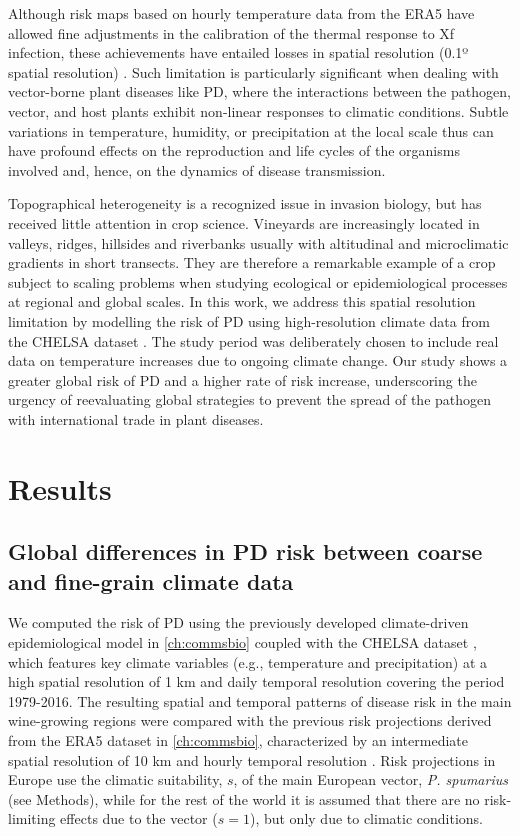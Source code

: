 Although risk maps based on hourly temperature data from the ERA5 have
allowed fine adjustments in the calibration of the thermal response to Xf
infection, these achievements have entailed losses in spatial resolution (0.1º
spatial resolution) \cite{GimenezRomero2022_CommsBio, ERA5_dataset}. Such
limitation is particularly significant when dealing with vector-borne plant
diseases like PD, where the interactions between the pathogen, vector, and host
plants exhibit non-linear responses to climatic conditions. Subtle variations
in temperature, humidity, or precipitation at the local scale thus can have
profound effects on the reproduction and life cycles of the organisms involved
and, hence, on the dynamics of disease transmission.

Topographical heterogeneity is a recognized issue in invasion biology, but
has received little attention in crop science.	Vineyards are increasingly
located in valleys, ridges, hillsides and riverbanks usually with altitudinal
and microclimatic gradients in short transects.  They are therefore a
remarkable example of  a crop subject to scaling problems when studying
ecological or epidemiological processes at  regional and global scales.  In
this work, we address this spatial resolution limitation by modelling the risk
of PD  using high-resolution climate data from the CHELSA dataset
\cite{Karger2017}. The study period was deliberately chosen  to include real
data on temperature increases due to ongoing climate change.  Our study shows a
greater global risk of PD and a higher rate of risk increase, underscoring the
urgency of reevaluating global strategies to prevent the spread of the pathogen
with international trade in plant diseases.

\section{Results}

\subsection{Global differences in  PD risk between coarse and fine-grain
    climate data}

We computed the risk of PD using the previously developed climate-driven
epidemiological model in \cref{ch:commsbio} \cite{GimenezRomero2022_CommsBio}
coupled with the CHELSA dataset \cite{Karger2017}, which features key climate
variables (e.g., temperature and precipitation) at a high spatial resolution of
1 km and daily temporal resolution covering the period 1979-2016. The resulting
spatial and temporal patterns of disease risk in the main wine-growing regions
were compared with the previous risk projections derived from the ERA5 dataset
\cite{munoz-sabater_era5-land_2021} in \cref{ch:commsbio}, characterized by an
intermediate  spatial resolution of 10 km  and hourly temporal resolution
\cite{GimenezRomero2022_CommsBio}. Risk projections in Europe use the
climatic suitability, $s$, of the main European vector, \textit{P. spumarius}
(see Methods), while for the rest of the world it is assumed that there are no
risk-limiting effects due to the vector  ($s=1$), but only due to climatic
conditions.

